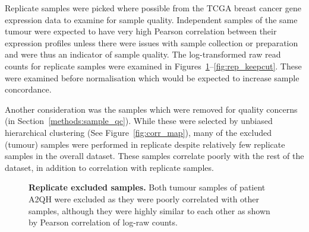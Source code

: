 Replicate samples were picked where possible from the \gls{TCGA} breast cancer gene expression data to examine for sample quality. Independent samples of the same tumour were expected to have very high Pearson correlation between their expression profiles unless there were issues with sample collection or preparation and were thus an indicator of sample quality. The log-transformed raw read counts for replicate samples were examined in Figures~\ref{fig:rep_cutcut}\nobreakdash--\ref{fig:rep_keepcut}. These were examined before normalisation which would be expected to increase sample concordance.

Another consideration was the samples which were removed for quality concerns (in Section~\ref{methods:sample_qc}). While these were selected by unbiased hierarchical clustering (See Figure~\ref{fig:corr_map}), many of the excluded (tumour) samples were performed in replicate despite relatively few replicate samples in the overall dataset. These samples correlate poorly with the rest of the dataset, in addition to correlation with replicate samples.

\begin{figure}[!hb]
  \centering
    \caption[Replicate excluded samples]{\small \textbf{Replicate excluded samples.} Both tumour samples of patient A2QH were excluded as they were poorly correlated with other samples, although they were highly similar to each other as shown by Pearson correlation of log-raw counts.
}
\label{fig:rep_cutcut}
\end{figure}

